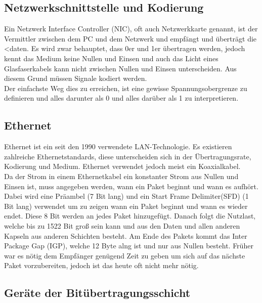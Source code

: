 \documentclass{article}
\begin{document}
	 \subsection{Netzwerkschnittstelle und Kodierung}
	 Ein Netzwerk Interface Controller (NIC), oft auch Netzwerkkarte genannt, ist der Vermittler zwischen dem PC und dem Netzwerk und empfängt und überträgt die <daten.
	 Es wird zwar behauptet, dass 0er und 1er übertragen werden, jedoch kennt das Medium keine Nullen und Einsen und auch das Licht eines Glasfaserkabels kann nicht zwischen Nullen und Einsen unterscheiden. Aus diesem Grund müssen Signale kodiert werden. \\
	 Der einfachste Weg dies zu erreichen, ist eine gewisse Spannungsobergrenze zu definieren und alles darunter als 0 und alles darüber als 1 zu interpretieren. 
	 \subsection{Ethernet}
	 Ethernet ist ein seit den 1990 verwendete LAN-Technologie. Es existieren zahlreiche Ethernetstandards, diese unterscheiden sich in der Übertragungsrate, Kodierung und Medium. Ethernet verwendet jedoch meist ein Koaxialkabel. \\
	 Da der Strom in einem Ethernetkabel ein konstanter Strom aus Nullen und Einsen ist, muss angegeben werden, wann ein Paket beginnt und wann es aufhört. Dabei wird eine Präambel (7 Bit lang) und ein Start Frame Delimiter(SFD) (1 Bit lang) verwendet um zu zeigen wann ein Paket beginnt und wann es wieder endet. Diese 8 Bit werden an jedes Paket hinzugefügt. Danach folgt die Nutzlast, welche bis zu 1522 Bit groß sein kann und aus den Daten und allen anderen Kapseln aus anderen Schichten besteht. Am Ende des Pakets kommt das Inter Package Gap (IGP), welche 12 Byte alng ist und nur aus Nullen besteht. Früher war es nötig dem Empfänger genügend Zeit zu geben um sich auf das nächste Paket vorzubereiten, jedoch ist das heute oft nicht mehr nötig. \\
	 \subsection{Geräte der Bitübertragungsschicht}
\end{document}
